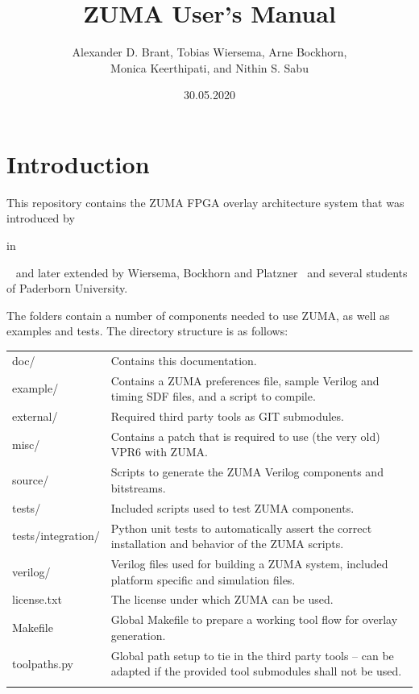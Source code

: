 \documentclass{article}
\begin{document}
\title{ZUMA User's Manual}
\author{Alexander D. Brant, Tobias Wiersema, Arne Bockhorn,\\ Monica Keerthipati, and Nithin S. Sabu}
\date{30.05.2020}
\maketitle
\tableofcontents

\section{Introduction}
This repository contains the ZUMA FPGA overlay architecture system that was introduced by 
\begin{NoHyper}\citeauthor{brantlemieux2012ZUMA} in \citeyear{brantlemieux2012ZUMA}\end{NoHyper}~\cite{brantlemieux2012ZUMA,brant2013MT} and later extended by Wiersema, Bockhorn and Platzner~\cite{wiersemaBP2014ZUMAReconOS,wiersemaBP2016ZUMAReconOS} and several students of Paderborn University.

\clearpage
\noindent The folders contain a number of components needed to use ZUMA, as well as examples and tests.
The directory structure is as follows:\\[1.5mm]
\renewcommand{\arraystretch}{1.4}%
\begin{tabularx}{\textwidth}{lX}
    \hline 
    doc/               &  Contains this documentation.  \\
    example/           &  Contains a ZUMA preferences file, sample Verilog and timing SDF files, and a script to compile.  \\
    external/          &  Required third party tools as GIT submodules. \\
    misc/              &  Contains a patch that is required to use (the very old) VPR6 with ZUMA. \\
    source/            &  Scripts to generate the ZUMA Verilog components and bitstreams. \\
    tests/             &  Included scripts used to test ZUMA components. \\
    tests/integration/ &  Python unit tests to automatically assert the correct installation and behavior of the ZUMA scripts. \\
    verilog/           &  Verilog files used for building a ZUMA system, included platform specific and simulation files. \\
    license.txt        &  The license under which ZUMA can be used. \\
    Makefile           &  Global Makefile to prepare a working tool flow for overlay generation. \\
    toolpaths.py       &  Global path setup to tie in the third party tools -- can be adapted if the provided tool submodules shall not be used. \\
    \hline \\
\end{tabularx}
\end{document}
